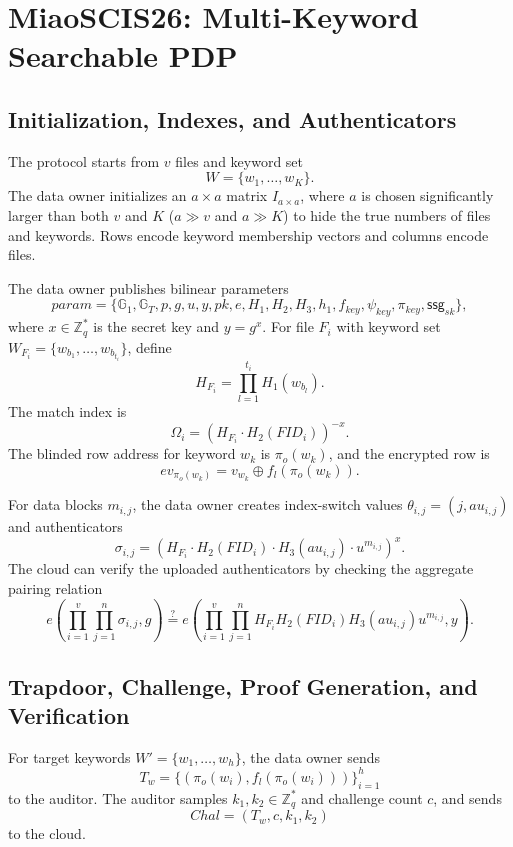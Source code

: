 \documentclass[11pt]{article}
\newcommand{\G}{\mathbb{G}}
\newcommand{\GT}{\mathbb{G}_T}
\newcommand{\Zq}{\mathbb{Z}_q}
\begin{document}
\section{MiaoSCIS26: Multi-Keyword Searchable PDP}

\subsection{Initialization, Indexes, and Authenticators}

The protocol starts from \(v\) files and keyword set
\[
    W=\{w_1,\ldots,w_K\}.
\]
The data owner initializes an \(a\times a\) matrix \(I_{a\times a}\), where
\(a\) is chosen significantly larger than both \(v\) and \(K\)
(\(a\gg v\) and \(a\gg K\)) to hide the true numbers of files and keywords.
Rows encode keyword membership vectors and columns encode files.

The data owner publishes bilinear parameters
\[
    param=\{\G_1,\GT,p,g,u,y,pk,e,H_1,H_2,H_3,h_1,
    f_{key},\psi_{key},\pi_{key},\mathsf{ssg}_{sk}\},
\]
where \(x\in\Zq^\ast\) is the secret key and \(y=g^x\).  For file \(F_i\)
with keyword set \(W_{F_i}=\{w_{b_1},\ldots,w_{b_{t_i}}\}\), define
\[
    H_{F_i}=\prod_{l=1}^{t_i}H_1(w_{b_l}).
\]
The match index is
\[
    \Omega_i=(H_{F_i}\cdot H_2(FID_i))^{-x}.
\]
The blinded row address for keyword \(w_k\) is \(\pi_o(w_k)\), and the
encrypted row is
\[
    ev_{\pi_o(w_k)}=v_{w_k}\oplus f_l(\pi_o(w_k)).
\]

For data blocks \(m_{i,j}\), the data owner creates index-switch values
\(\theta_{i,j}=(j,au_{i,j})\) and authenticators
\[
    \sigma_{i,j}
    =
    \left(
        H_{F_i}\cdot H_2(FID_i)\cdot H_3(au_{i,j})\cdot u^{m_{i,j}}
    \right)^x.
\]
The cloud can verify the uploaded authenticators by checking the aggregate
pairing relation
\[
    e\!\left(\prod_{i=1}^{v}\prod_{j=1}^{n}\sigma_{i,j},g\right)
    \stackrel{?}{=}
    e\!\left(
        \prod_{i=1}^{v}\prod_{j=1}^{n}
        H_{F_i}H_2(FID_i)H_3(au_{i,j})u^{m_{i,j}},
        y
    \right).
\]

\subsection{Trapdoor, Challenge, Proof Generation, and Verification}

For target keywords \(W'=\{w_1,\ldots,w_h\}\), the data owner sends
\[
    T_w=\{(\pi_o(w_i),f_l(\pi_o(w_i)))\}_{i=1}^{h}
\]
to the auditor.  The auditor samples \(k_1,k_2\in\Zq^\ast\) and challenge
count \(c\), and sends
\[
    Chal=(T_w,c,k_1,k_2)
\]
to the cloud.
\end{document}
